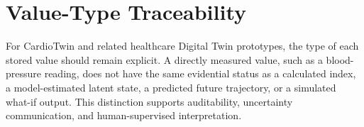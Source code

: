 \section{Value-Type Traceability}
For CardioTwin and related healthcare Digital Twin prototypes, the type of each stored value should remain explicit. A directly measured value, such as a blood-pressure reading, does not have the same evidential status as a calculated index, a model-estimated latent state, a predicted future trajectory, or a simulated what-if output. This distinction supports auditability, uncertainty communication, and human-supervised interpretation.

\clearpage

